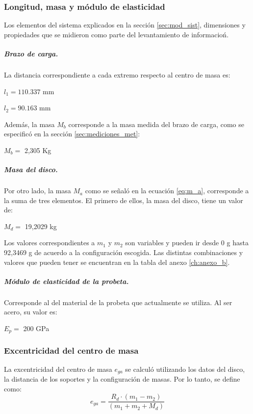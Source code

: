 \subsubsection{Longitud, masa y módulo de elasticidad}
Los elementos del sistema explicados en la sección \ref{sec:mod_sist}, dimensiones y propiedades que se midieron como parte del levantamiento de informacioń. 
\subparagraph{\textit{Brazo de carga.}}
La distancia correspondiente a cada extremo respecto al centro de masa es:
\begin{itemize*}
	\item $l_1= 110.337$ mm
	\item $l_2= 90.163$ mm
\end{itemize*}
Además, la masa $M_b$ corresponde a la masa medida del brazo de carga, como se especificó en la sección \ref{sec:mediciones_met}:
\begin{itemize*}
	\item $M_b=$ 2,305 Kg
\end{itemize*}
\subparagraph{\textit{Masa del disco}.}
Por otro lado, la masa $M_a$ como se señaló en la ecuación \ref{eq:m_a}, corresponde a la suma de tres elementos. El primero de ellos, la masa del disco, tiene un valor de:
\begin{itemize*}
	\item $M_d=$ 19,2029 kg
\end{itemize*}
Los valores correspondientes a $m_1$ y $m_2$ son variables y pueden ir desde 0 g hasta 92,3469 g de acuerdo a la configuración escogida. Las distintas combinaciones y valores que pueden tener se encuentran en la tabla del anexo \ref{ch:anexo_b}.
\subparagraph{\textit{Módulo de elasticidad de la probeta}.}
Corresponde al del material de la probeta que actualmente se utiliza. Al ser acero, su valor es:
\begin{itemize*}
	\item $E_p=$ 200 GPa
\end{itemize*}
\subsubsection{Excentricidad del centro de masa}
La excentricidad del centro de masa $e_{ga}$ se calculó utilizando los datos del disco, la distancia de los soportes y la configuración de masas. Por lo tanto, se define como:
\begin{equation}
	e_{ga} = \frac{R_d\cdot (m_1 - m_2)}{(m_1 + m_2 + M_d)}
\end{equation}
